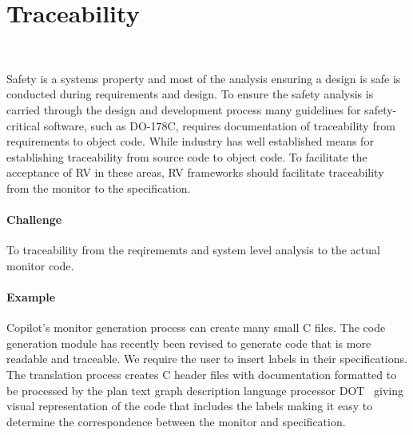 \section{Traceability}~\label{sec:trace}

Safety is a systems property and most of the analysis ensuring a
design is safe is conducted during requirements and design.  To ensure
the safety analysis is carried through the design and development
process many guidelines for safety-critical software, such as DO-178C,
requires documentation of traceability from requirements to object
code. While industry has well established means for establishing
traceability from source code to object code.  To facilitate the
acceptance of RV in these areas, RV frameworks should facilitate
traceability from the monitor to the specification.

 \paragraph{Challenge} 
To  traceability from the reqirememts and system level analysis to the actual monitor code. 

\paragraph{Example} Copilot's monitor generation process can create many small C
files. The code generation module has recently been revised to
generate code that is more readable and traceable.  We require the
user to insert labels in their specifications. The translation process
creates C header files with documentation formatted to be processed by
the plan text graph description language processor  DOT~\cite{ZZZZ}
giving  visual representation of the code  that includes the labels
making it easy to determine the correspondence between the monitor and 
specification. 

 

